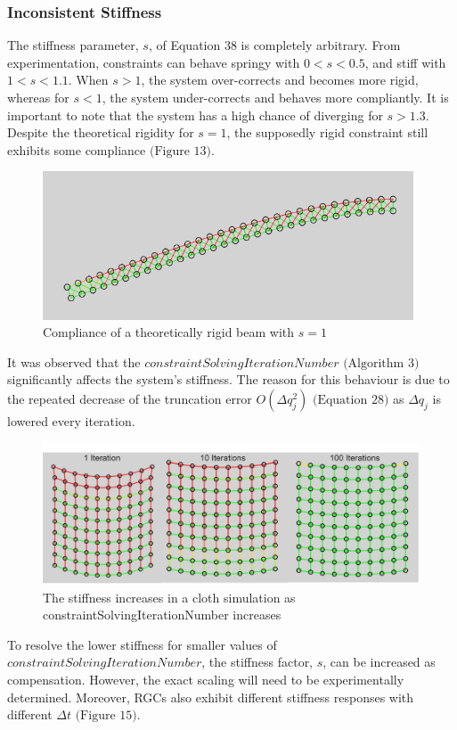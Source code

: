 \documentclass[12pt, letterpaper]{article}
\begin{document}
\subsubsection{Inconsistent Stiffness}
\hspace{\parindent}The stiffness parameter, $s$, of Equation 38 is completely arbitrary. From experimentation, constraints can behave springy with $0 < s < 0.5$, and stiff with $1 < s < 1.1$. When $s > 1$, the system over-corrects and becomes more rigid, whereas for $s < 1$, the system under-corrects and behaves more compliantly. It is important to note that the system has a high chance of diverging for $s > 1.3$. Despite the theoretical rigidity for $s = 1$, the supposedly rigid constraint still exhibits some compliance $\text{(Figure 13)}$. 
\begin{figure}[H]
\centering
\includegraphics[width=11cm]{rgc compliance.png}
\caption{Compliance of a theoretically rigid beam with $s = 1$}
\label{fig:figure}
\end{figure} 
It was observed that the $constraintSolvingIterationNumber$ $\text{(Algorithm 3)}$ significantly affects the system’s stiffness. The reason for this behaviour is due to the repeated decrease of the truncation error $O(\Delta q_j^{2})$ $\text{(Equation 28)}$ as $\Delta q_j$ is lowered every iteration.
\begin{figure}[H]
\centering
\includegraphics[width=12cm]{rgc iteration.png}
\caption{The stiffness increases in a cloth simulation as constraintSolvingIterationNumber increases}
\label{fig:figure}
\end{figure} 
\noindent To resolve the lower stiffness for smaller values of $constraintSolvingIterationNumber$, the stiffness factor, $s$, can be increased as compensation. However, the exact scaling will need to be experimentally determined. Moreover, RGCs also exhibit different stiffness responses with different $\Delta t$ $\text{(Figure 15)}$. 
\end{document}

